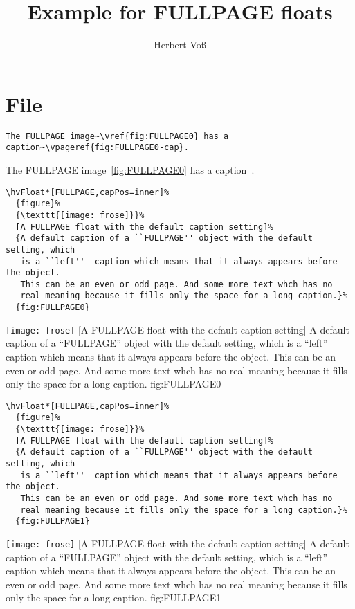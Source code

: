 \documentclass[twoside,twocolumn]{scrartcl}
\begin{document}
\title{Example for FULLPAGE floats}
\author{Herbert Voß}
\maketitle

\tableofcontents

\blinddocument

\section{File \texttt{\jobname}}

\begin{lstlisting}
The FULLPAGE image~\vref{fig:FULLPAGE0} has a caption~\vpageref{fig:FULLPAGE0-cap}.
\end{lstlisting}

The FULLPAGE image~\vref{fig:FULLPAGE0} has a caption~.

\begin{lstlisting}
\hvFloat*[FULLPAGE,capPos=inner]%
  {figure}%
  {\texttt{[image: frose]}}%
  [A FULLPAGE float with the default caption setting]%
  {A default caption of a ``FULLPAGE'' object with the default setting, which
   is a ``left''  caption which means that it always appears before the object.
   This can be an even or odd page. And some more text whch has no
   real meaning because it fills only the space for a long caption.}%
  {fig:FULLPAGE0}
\end{lstlisting}


\Float[default]
%
  {\texttt{[image: frose]}}%
  [A FULLPAGE float with the default caption setting]%
  {A default caption of a ``FULLPAGE'' object with the default setting, which
   is a ``left''  caption which means that it always appears before the object.
   This can be an even or odd page. And some more text whch has no
   real meaning because it fills only the space for a long caption.}%
  {fig:FULLPAGE0}

\blinddocument

\begin{lstlisting}
\hvFloat*[FULLPAGE,capPos=inner]%
  {figure}%
  {\texttt{[image: frose]}}%
  [A FULLPAGE float with the default caption setting]%
  {A default caption of a ``FULLPAGE'' object with the default setting, which
   is a ``left''  caption which means that it always appears before the object.
   This can be an even or odd page. And some more text whch has no
   real meaning because it fills only the space for a long caption.}%
  {fig:FULLPAGE1}
\end{lstlisting}


\Float[default]
%
  {\texttt{[image: frose]}}%
  [A FULLPAGE float with the default caption setting]%
  {A default caption of a ``FULLPAGE'' object with the default setting, which
   is a ``left''  caption which means that it always appears before the object.
   This can be an even or odd page. And some more text whch has no
   real meaning because it fills only the space for a long caption.}%
  {fig:FULLPAGE1}

\blinddocument

\Blindtext

\blindtext
\end{document}
